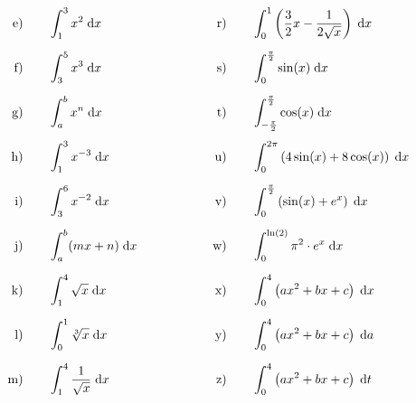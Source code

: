 \begin{exercise}
\begin{alignat*}{5}
        \text{e)\vstrut}&\quad & \exce & \separator & \text{r)\vstrut}&\quad & \excr \\
        \text{f)\vstrut}&\quad & \excf & \separator & \text{s)\vstrut}&\quad & \excs \\
        \text{g)\vstrut}&\quad & \excg & \separator & \text{t)\vstrut}&\quad & \exct \\
        \text{h)\vstrut}&\quad & \exch & \separator & \text{u)\vstrut}&\quad & \excu \\
        \text{i)\vstrut}&\quad & \exci & \separator & \text{v)\vstrut}&\quad & \excv \\
        \text{j)\vstrut}&\quad & \excj & \separator & \text{w)\vstrut}&\quad & \excw \\
        \text{k)\vstrut}&\quad & \exck & \separator & \text{x)\vstrut}&\quad & \excx \\
        \text{l)\vstrut}&\quad & \excl & \separator & \text{y)\vstrut}&\quad & \excy \\
        \text{m)\vstrut}&\quad & \excm & \separator & \text{z)\vstrut}&\quad & \excz
      \end{alignat*}
    \endgroup
  \fi
\end{exercise}
